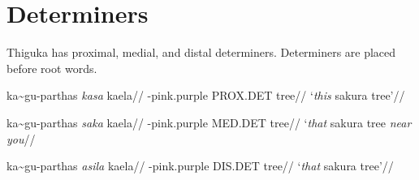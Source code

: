 \section{Determiners}
Thiguka has proximal, medial, and distal determiners. Determiners are placed before root words. 

\ex
\begingl
    \gla ka\~{}{}gu-parthas \emph{kasa} kaela//  
    \glb \agradj{}-pink.purple PROX.DET tree//  
    \glft `\emph{this} sakura tree'//  
\endgl
\xe

\ex
\begingl
    \gla ka\~{}{}gu-parthas \emph{saka} kaela//  
    \glb \agradj{}-pink.purple MED.DET tree//  
    \glft `\emph{that} sakura tree \emph{near you}//  
\endgl
\xe

\ex
\begingl
    \gla ka\~{}{}gu-parthas \emph{asila} kaela//  
    \glb \agradj{}-pink.purple DIS.DET tree//  
    \glft `\emph{that} sakura tree'//  
\endgl
\xe